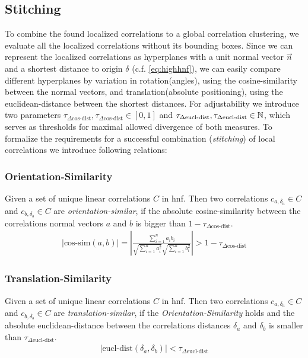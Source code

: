 \subsection{Stitching}\label{ssec:stitching}

To combine the found localized correlations to a global correlation clustering, we evaluate all the localized correlations without its bounding boxes. Since we can represent the localized correlations as hyperplanes with a unit normal vector $\vec{n}$ and a shortest distance to origin $\delta$ (c.f. \autoref{eq:highhnf}), we can easily compare different hyperplanes by variation in rotation(angles), using the cosine-similarity between the normal vectors, and translation(absolute positioning), using the euclidean-distance between the shortest distances. For adjustability we introduce two parameters $\tau_{\Delta \text{cos-dist}}, \tau_{\Delta \text{cos-dist}} \in [0,1]$ and $\tau_{\Delta \text{eucl-dist}}, \tau_{\Delta \text{eucl-dist}} \in \mathbb{N}$, which serves as thresholds for maximal allowed divergence of both measures. To formalize the requirements for a successful combination (\textit{stitching}) of local correlations we introduce following relations:

\subsubsection*{Orientation-Similarity}
Given a set of unique linear correlations $C$ in \gls{hnf}. Then two correlations $c_{a,\delta_a} \in C$ and $c_{b,\delta_b} \in C$ are \textit{orientation-similar}, if the absolute cosine-similarity between the correlations normal vectors $a$ and $b$ is bigger than $1 - \tau_{\Delta \text{cos-dist}}$.
\begin{align}\label{eq:cosdist}
    |\text{cos-sim}(a,b)| = \left|\frac{\sum_{i=1}^{n} a_{i} b_{i}}{\sqrt{\sum_{i=1}^{n} a_{i}^{2}} \sqrt{\sum_{i=1}^{n} b_{i}^{2}}}\right| > 1 - \tau_{\Delta \text{cos-dist}}
\end{align}

\subsubsection*{Translation-Similarity}
Given a set of unique linear correlations $C$ in \gls{hnf}. Then two correlations $c_{a,\delta_a} \in C$ and $c_{b,\delta_b} \in C$ are \textit{translation-similar}, if the \textit{Orientation-Similarity} holds and the absolute euclidean-distance between the correlations distances $\delta_a$ and $\delta_b$ is smaller than $\tau_{\Delta \text{eucl-dist}}$.
\begin{align}\label{eq:eucldist}
    |\text{eucl-dist}(\delta_a,\delta_b)| < \tau_{\Delta \text{eucl-dist}}
\end{align}

